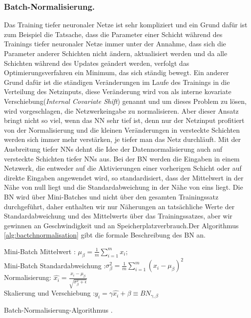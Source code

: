 \documentclass[12pt,a4paper]{scrartcl}
\numberwithin{equation}{section}
\begin{document}
\subsubsection{Batch-Normalisierung.}\label{Batch-Normalisierung}
Das Training tiefer neuronaler Netze ist sehr kompliziert und ein Grund dafür ist zum Beispiel die Tatsache, dass die Parameter einer Schicht während des Trainings tiefer neuronaler Netze immer unter der Annahme, dass sich die Parameter anderer Schichten nicht ändern, aktualisiert werden und da alle Schichten während des Updates geändert werden, verfolgt das Optimierungsverfahren ein Minimum, das sich ständig bewegt. Ein anderer Grund dafür ist die ständigen Veränderungen im Laufe des Trainings in die Verteilung des Netzinputs, diese Veränderung wird von \cite{bactchnormalisation} als interne kovariate Verschiebung(\textit{Internal Covariate Shift}) genannt und um dieses Problem zu lösen, wird vorgeschlagen, die Netzwerkeingabe zu normalisieren. Aber dieser Ansatz bringt nicht so viel, wenn das \ac{NN} sehr tief ist, denn nur der Netzinput profitiert von der Normalisierung und die kleinen Veränderungen in versteckte Schichten werden sich immer mehr verstärken, je tiefer man das Netz durchläuft. Mit der Ausbreitung tiefer \acsp{NN} dehnt die Idee der Datennormalisierung auch auf versteckte Schichten tiefer \acsp{NN} aus. Bei der BN werden die Eingaben in einem Netzwerk, die entweder auf die Aktivierungen einer vorherigen Schicht oder auf direkte Eingaben angewendet wird, so standardisiert, dass der Mittelwert in der Nähe von null liegt und die Standardabweichung in der Nähe von eins liegt. Die BN wird über Mini-Batches und nicht über den gesamten Trainingssatz durchgeführt, daher enthalten wir nur Näherungen an tatsächliche Werte der Standardabweichung und des Mittelwerts über das Trainingssatzes, aber wir gewinnen an Geschwindigkeit und an Speicherplatzverbrauch.Der Algorithmus \ref{alg:bactchnormalisation} gibt die formale Beschreibung des BN  an.

\begin{algorithm}
	\DontPrintSemicolon

 	Mini-Batch Mittelwert  :  $ \mu_\beta=\frac{1}{m}\sum_{i = 1}^{m}x_i $;\\
	Mini-Batch Standardabweichung :$  \sigma_\beta^2=\frac{1}{m}\sum_{i = 1}^{m}(x_i- \mu_\beta)^2 $\\
	Normalisierung:  $ \widehat{x_i} = \frac{x_i - \mu_\beta}{\sqrt{\sigma_\beta^2 + \epsilon}} $\\
	Skalierung und Verschiebung :$ {y_i} = \gamma\widehat{x_i} + \beta \equiv BN_{\gamma, \beta} $
	\caption{Batch-Normalisierung-Algorithmus \cite{bactchnormalisation}.}
	\label{alg:bactchnormalisation}
\end{algorithm}
\end{document}

